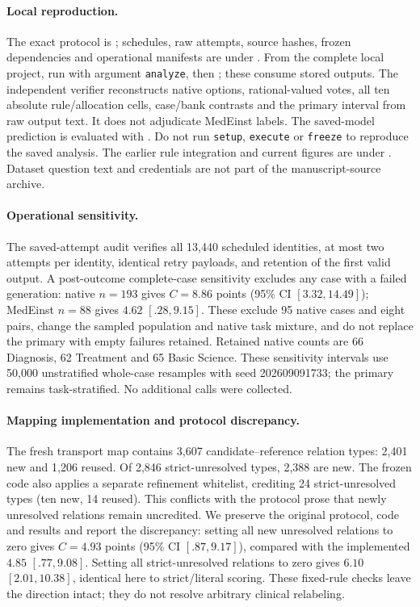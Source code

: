 \paragraph{Local reproduction.}
The exact protocol is ; schedules, raw attempts, source hashes, frozen dependencies and operational manifests are under . From the complete local project, run  with argument \texttt{analyze}, then ; these consume stored outputs. The independent verifier reconstructs native options, rational-valued votes, all ten absolute rule/allocation cells, case/bank contrasts and the primary interval from raw output text. It does not adjudicate MedEinst labels. The saved-model prediction is evaluated with . Do not run \texttt{setup}, \texttt{execute} or \texttt{freeze} to reproduce the saved analysis. The earlier rule integration and current figures are under . Dataset question text and credentials are not part of the manuscript-source archive.

\paragraph{Operational sensitivity.}
The saved-attempt audit verifies all 13,440 scheduled identities, at most two attempts per identity, identical retry payloads, and retention of the first valid output. A post-outcome complete-case sensitivity excludes any case with a failed generation: native $n=193$ gives $C=8.86$ points (95\% CI $[3.32,14.49]$); MedEinst $n=88$ gives $4.62$ $[.28,9.15]$. These exclude 95 native cases and eight pairs, change the sampled population and native task mixture, and do not replace the primary with empty failures retained. Retained native counts are 66 Diagnosis, 62 Treatment and 65 Basic Science. These sensitivity intervals use 50,000 unstratified whole-case resamples with seed 202609091733; the primary remains task-stratified. No additional calls were collected.

\paragraph{Mapping implementation and protocol discrepancy.}
The fresh transport map contains 3,607 candidate--reference relation types: 2,401 new and 1,206 reused. Of 2,846 strict-unresolved types, 2,388 are new. The frozen code also applies a separate refinement whitelist, crediting 24 strict-unresolved types (ten new, 14 reused). This conflicts with the protocol prose that newly unresolved relations remain uncredited. We preserve the original protocol, code and results and report the discrepancy: setting all new unresolved relations to zero gives $C=4.93$ points (95\% CI $[.87,9.17]$), compared with the implemented $4.85$ $[.77,9.08]$. Setting all strict-unresolved relations to zero gives $6.10$ $[2.01,10.38]$, identical here to strict/literal scoring. These fixed-rule checks leave the direction intact; they do not resolve arbitrary clinical relabeling.

